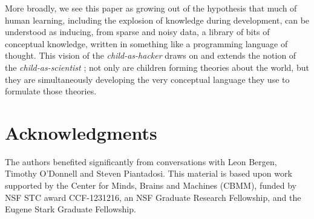 \documentclass[10pt,letterpaper]{article}
\begin{document}
More broadly, we see this paper as growing out of the hypothesis that
much of human learning, including the explosion of knowledge during
development, can be understood as inducing, from sparse and noisy data,
a library of bits of conceptual knowledge, written in something like a
programming language of thought. This vision of the
\emph{child-as-hacker} draws on and extends the notion of the
\emph{child-as-scientist} \citep{gopnik1996scientist}; not only are
children forming theories about the world, but they are simultaneously
developing the very conceptual language they use to formulate those
theories.

\section{Acknowledgments}

The authors benefited significantly from conversations with Leon
Bergen, Timothy O'Donnell and Steven Piantadosi. This material is
based upon work supported by the Center for Minds, Brains and Machines
(CBMM), funded by NSF STC award CCF-1231216, an NSF Graduate Research
Fellowship, and the Eugene Stark Graduate Fellowship.



\setlength{\bibleftmargin}{.125in}
\setlength{\bibindent}{-\bibleftmargin}

\end{document}
